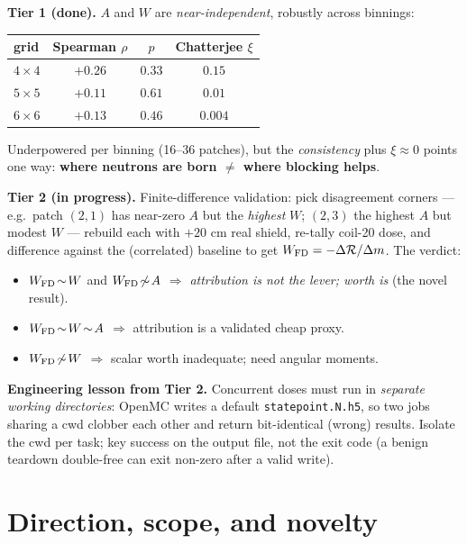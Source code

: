 \documentclass[11pt]{article}
\newcommand{\R}{\mathcal{R}}
\begin{document}
\textbf{Tier 1 (done).} $A$ and $W$ are \emph{near-independent}, robustly across binnings:
\begin{center}
\begin{tabular}{lccc}
\toprule
grid & Spearman $\rho$ & $p$ & Chatterjee $\xi$ \\
\midrule
$4\times4$ & $+0.26$ & $0.33$ & $0.15$ \\
$5\times5$ & $+0.11$ & $0.61$ & $0.01$ \\
$6\times6$ & $+0.13$ & $0.46$ & $0.004$ \\
\bottomrule
\end{tabular}
\end{center}
Underpowered per binning (16--36 patches), but the \emph{consistency} plus $\xi\approx0$ points
one way: \textbf{where neutrons are born $\neq$ where blocking helps}.

\textbf{Tier 2 (in progress).} Finite-difference validation: pick disagreement corners
--- e.g.\ patch $(2,1)$ has near-zero $A$ but the \emph{highest} $W$; $(2,3)$ the highest $A$ but
modest $W$ --- rebuild each with $+20$ cm real shield, re-tally coil-20 dose, and difference
against the (correlated) baseline to get $W_{\rm FD}=-\Delta\R/\Delta m$. The verdict:
\begin{itemize}
\item $W_{\rm FD}\!\sim\!W$ and $W_{\rm FD}\!\not\sim\!A$ $\Rightarrow$ \emph{attribution is not
  the lever; worth is} (the novel result).
\item $W_{\rm FD}\!\sim\!W\!\sim\!A$ $\Rightarrow$ attribution is a validated cheap proxy.
\item $W_{\rm FD}\!\not\sim\!W$ $\Rightarrow$ scalar worth inadequate; need angular moments.
\end{itemize}

\begin{key}
\textbf{Engineering lesson from Tier 2.} Concurrent doses must run in \emph{separate working
directories}: OpenMC writes a default \texttt{statepoint.N.h5}, so two jobs sharing a cwd clobber
each other and return bit-identical (wrong) results. Isolate the cwd per task; key success on the
output file, not the exit code (a benign teardown double-free can exit non-zero after a valid
write).
\end{key}

\section{Direction, scope, and novelty}
\label{sec:direction}
\end{document}
